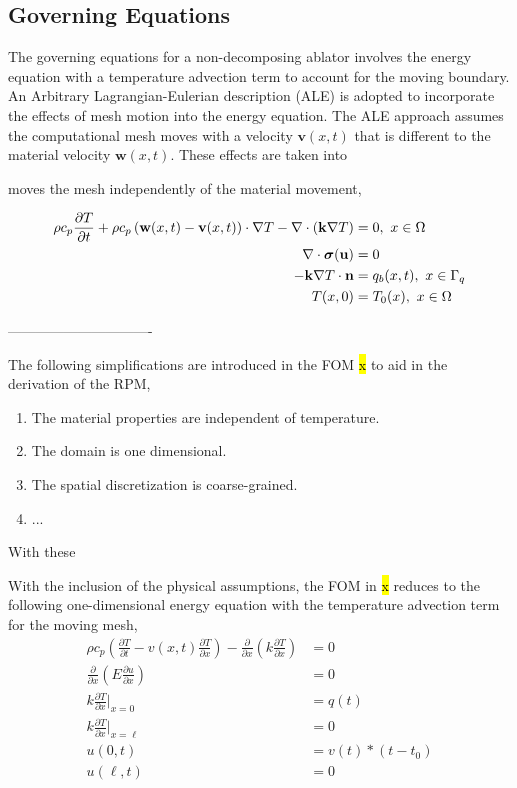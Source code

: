 \subsection{Governing Equations}

The governing equations for a non-decomposing ablator involves the energy equation with a temperature advection term to account for the moving boundary. An Arbitrary Lagrangian-Eulerian description (ALE) is adopted to incorporate the effects of mesh motion into the energy equation. The ALE approach assumes the computational mesh moves with a velocity $\mathbf{v}(x,t)$ that is different to the material velocity $\mathbf{w}(x,t)$. These effects are taken into 

moves the mesh independently of the material movement, 

\begin{subequations}\label{eqn_pde}
    \begin{align}
        \rho c_p\frac{\partial T}{\partial t} + \rho c_p\left(\mathbf{w}(x,t) - \mathbf{v}(x,t)\right)\cdot\nabla T - \nabla\cdot (\mathbf{k} \nabla T) &= 0,\ x\in\Omega \\
        \nabla\cdot\boldsymbol{\sigma}(\mathbf{u}) &= 0\\
        -\mathbf{k}\nabla T\cdot {\mathbf{n}}  &= q_b(x,t),\ x\in\Gamma_q \\
        T(x,0) &= T_0(x),\ x\in\Omega
    \end{align}
\end{subequations}

-------------------------------

The following simplifications are introduced in the FOM \hl{x} to aid in the derivation of the RPM,
\begin{enumerate}
    \item The material properties are independent of temperature.
    \item The domain is one dimensional.
    \item The spatial discretization is coarse-grained.
    \item ...
\end{enumerate}
With these 


With the inclusion of the physical assumptions, the FOM in \hl{x} reduces to the following one-dimensional energy equation with the temperature advection term for the moving mesh,
\begin{subequations}
    \begin{align}
        \rho c_p\left(\frac{\partial T}{\partial t} - v(x,t)\frac{\partial T}{\partial x}\right) - \frac{\partial}{\partial x}\left(k\frac{\partial T}{\partial x}\right) &= 0\\
        \frac{\partial}{\partial x}\left(E\frac{\partial u}{\partial x}\right) &= 0\label{eqn_elasticity_1d}\\
        k\frac{\partial T}{\partial x}\Bigg|_{x=0} &= q(t)\label{eqn_neumann_bc}\\
        k\frac{\partial T}{\partial x}\Bigg|_{x=\ell} &= 0\\
        u(0,t) &= v(t) * (t - t_0)\\
        u(\ell,t) &= 0
    \end{align}
\end{subequations}

